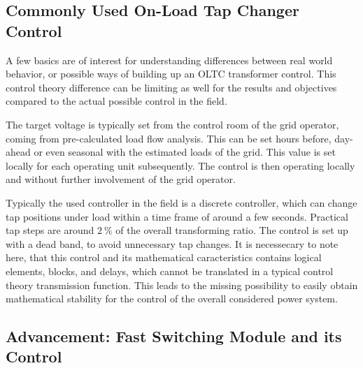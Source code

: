 \subsection{Commonly Used On-Load Tap Changer Control}

A few basics are of interest for understanding differences between real world behavior, or possible ways of building up an \acs{OLTC} transformer control. 
This control theory difference can be limiting as well for the results and objectives compared to the actual possible control in the field.

The target voltage is typically set from the control room of the grid operator, coming from pre-calculated load flow analysis. 
This can be set hours before, day-ahead or even seasonal with the estimated loads of the grid. 
This value is set locally for each operating unit subsequently. 
The control is then operating locally and without further involvement of the grid operator. \autocite{machowski_2020}

Typically the used controller in the field is a discrete controller, which can change tap positions under load within a time frame of around a few seconds. 
Practical tap steps are around $2~\mathrm{\%}$ of the overall transforming ratio. 
The control is set up with a dead band, to avoid unnecessary tap changes. 
It is necessecary to note here, that this control and its mathematical caracteristics contains logical elements, blocks, and delays, which cannot be translated in a typical control theory transmission function. 
This leads to the missing possibility to easily obtain mathematical stability for the control of the overall considered power system. \autocite{machowski_2020,kundur_2022}

\subsection{Advancement: Fast Switching Module and its Control}
\label{sec:fsm-description}

